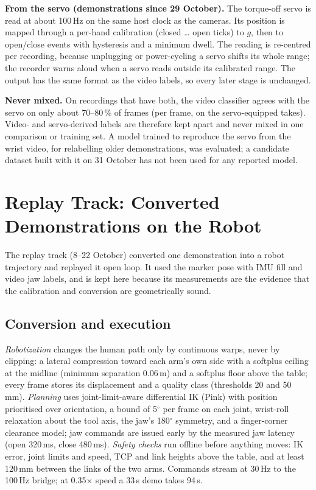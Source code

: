 \documentclass[conference,10pt]{IEEEtran}
\newcommand{\mm}{\,mm\xspace}
\begin{document}
\textbf{From the servo (demonstrations since 29 October).} The torque-off servo is read at about 100\,Hz on the same host
clock as the cameras. Its position is mapped through a per-hand calibration (closed \ldots{} open ticks) to $g$, then to
open/close events with hysteresis and a minimum dwell. The reading is re-centred per recording, because unplugging or
power-cycling a servo shifts its whole range; the recorder warns aloud when a servo reads outside its calibrated range.
The output has the same format as the video labels, so every later stage is unchanged.

\textbf{Never mixed.} On recordings that have both, the video classifier agrees with the servo on only about 70--80\,\% of
frames (per frame, on the servo-equipped takes). Video- and servo-derived labels are therefore kept apart and never mixed in one comparison or training set. A
model trained to reproduce the servo from the wrist video, for relabelling older demonstrations, was evaluated; a
candidate dataset built with it on 31 October has not been used for any reported model.

\section{Replay Track: Converted Demonstrations on the Robot}\label{sec:replay}
The replay track (8--22 October) converted one demonstration into a robot trajectory and replayed it open loop. It used
the marker pose with IMU fill and video jaw labels, and is kept here because its measurements are the evidence that the
calibration and conversion are geometrically sound.

\subsection{Conversion and execution}
\emph{Robotization} changes the human path only by continuous warps, never by clipping: a lateral compression toward each
arm's own side with a softplus ceiling at the midline (minimum separation 0.06\,m) and a softplus floor above the table;
every frame stores its displacement and a quality class (thresholds 20 and 50\mm). \emph{Planning} uses
joint-limit-aware differential IK (Pink) with position prioritised over orientation, a bound of 5$^\circ$ per frame on
each joint, wrist-roll relaxation about the tool axis, the jaw's 180$^\circ$ symmetry, and a finger-corner clearance
model; jaw commands are issued early by the measured jaw latency (open 320\,ms, close 480\,ms). \emph{Safety checks} run
offline before anything moves: IK error, joint limits and speed, TCP and link heights above the table, and at least
120\mm between the links of the two arms. Commands stream at 30\,Hz to the 100\,Hz bridge; at 0.35$\times$ speed a 33\,s
demo takes 94\,s.
\end{document}
